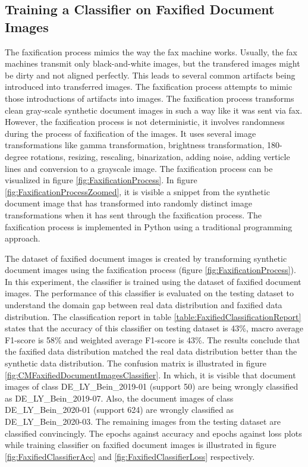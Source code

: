 \subsection{Training a Classifier on Faxified Document Images}\label{trainingfaxifiedclassifier}


The faxification process mimics the way the fax machine works. Usually, the fax machines transmit only black-and-white images, but the transfered images might be dirty and not aligned perfectly. This leads to several common artifacts being introduced into transferred images. The faxification process attempts to mimic those introductions of artifacts into images. The faxification process transforms clean gray-scale synthetic document images in such a way like it was sent via fax. However, the faxification process is not deterministic, it involves randomness during the process of faxification of the images. It uses several image transformations like gamma transformation, brightness transformation, 180-degree rotations, resizing, rescaling, binarization, adding noise, adding verticle lines and conversion to a grayscale image. The faxification process can be visualized in figure \ref{fig:FaxificationProcess}. In figure \ref{fig:FaxificationProcessZoomed}, it is visible a snippet from the synthetic document image that has transformed into randomly distinct image transformations when it has sent through the faxification process. The faxification process is implemented in Python using a traditional programming approach.

The dataset of faxified document images is created by transforming synthetic document images using the faxification process (figure \ref{fig:FaxificationProcess}). In this experiment, the classifier is trained using the dataset of faxified document images. The performance of this classifier is evaluated on the testing dataset to understand the domain gap between real data distribution and faxified data distribution. The classification report in table \ref{table:FaxifiedClassificationReport} states that the accuracy of this classifier on testing dataset is 43\%, macro average F1-score is  58\% and weighted average F1-score is 43\%. The results conclude that the faxified data distribution matched the real data distribution better than the synthetic data distribution. The confusion matrix is illustrated in figure \ref{fig:CMFaxifiedDocumentImagesClassifier}. In which, it is visible that document images of class DE\_LY\_Bein\_2019-01 (support 50) are being wrongly classified as DE\_LY\_Bein\_2019-07. Also, the document images of class DE\_LY\_Bein\_2020-01 (support 624) are wrongly classified as DE\_LY\_Bein\_2020-03. The remaining images from the testing dataset are classified convincingly. The epochs against accuracy and epochs against loss plots while training classifier on faxified document images is illustrated in figure \ref{fig:FaxifiedClassifierAcc} and \ref{fig:FaxifiedClassifierLoss} respectively.



